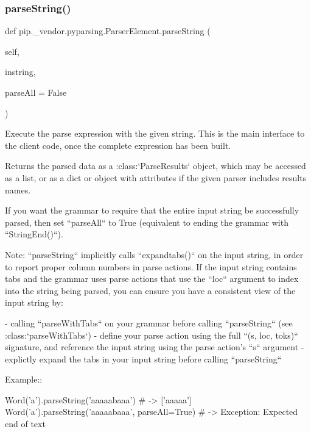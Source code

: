 \subsubsection{\texorpdfstring{parse\+String()}{parseString()}}
{\footnotesize\ttfamily def pip.\+\_\+vendor.\+pyparsing.\+Parser\+Element.\+parse\+String (\begin{DoxyParamCaption}\item[{}]{self,  }\item[{}]{instring,  }\item[{}]{parse\+All = {\ttfamily False} }\end{DoxyParamCaption})}

\begin{DoxyVerb}Execute the parse expression with the given string.
This is the main interface to the client code, once the complete
expression has been built.

Returns the parsed data as a :class:`ParseResults` object, which may be
accessed as a list, or as a dict or object with attributes if the given parser
includes results names.

If you want the grammar to require that the entire input string be
successfully parsed, then set ``parseAll`` to True (equivalent to ending
the grammar with ``StringEnd()``).

Note: ``parseString`` implicitly calls ``expandtabs()`` on the input string,
in order to report proper column numbers in parse actions.
If the input string contains tabs and
the grammar uses parse actions that use the ``loc`` argument to index into the
string being parsed, you can ensure you have a consistent view of the input
string by:

- calling ``parseWithTabs`` on your grammar before calling ``parseString``
  (see :class:`parseWithTabs`)
- define your parse action using the full ``(s, loc, toks)`` signature, and
  reference the input string using the parse action's ``s`` argument
- explictly expand the tabs in your input string before calling
  ``parseString``

Example::

    Word('a').parseString('aaaaabaaa')  # -> ['aaaaa']
    Word('a').parseString('aaaaabaaa', parseAll=True)  # -> Exception: Expected end of text
\end{DoxyVerb}
 \mbox{\label{classpip_1_1__vendor_1_1pyparsing_1_1ParserElement_ad8d9e9e959504a2e35207558d82ffb8e}} 

